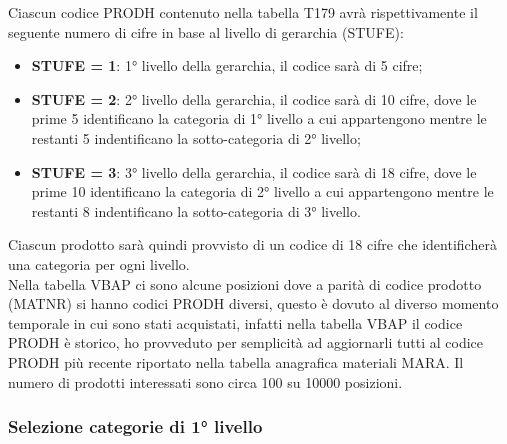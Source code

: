 Ciascun codice PRODH contenuto nella tabella T179 avrà rispettivamente il seguente numero di cifre in base al livello di gerarchia (STUFE):
\begin{itemize}
	\item \textbf{STUFE = 1}: 1° livello della gerarchia, il codice sarà di 5 cifre;
	\item \textbf{STUFE = 2}: 2° livello della gerarchia, il codice sarà di 10 cifre, dove le prime 5 identificano la categoria di 1° livello a cui appartengono mentre le restanti 5 indentificano la sotto-categoria di 2° livello;
	\item \textbf{STUFE = 3}: 3° livello della gerarchia, il codice sarà di 18 cifre, dove le prime 10 identificano la categoria di 2° livello a cui appartengono mentre le restanti 8 indentificano la sotto-categoria di 3° livello.
\end{itemize}
Ciascun prodotto sarà quindi provvisto di un codice di 18 cifre che identificherà una categoria per ogni livello.\\
Nella tabella VBAP ci sono alcune posizioni dove a parità di codice prodotto (MATNR) si hanno codici PRODH diversi, questo è dovuto al diverso momento temporale in cui sono stati acquistati, infatti nella tabella VBAP il codice PRODH è storico, ho provveduto per semplicità ad aggiornarli tutti al codice PRODH più recente riportato nella tabella anagrafica materiali MARA.
Il numero di prodotti interessati sono circa 100 su 10000 posizioni.\\
\subsubsection{Selezione categorie di 1° livello}

